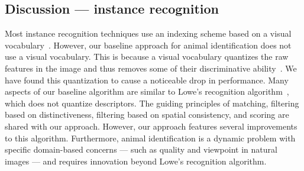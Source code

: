     \subsection{Discussion --- instance recognition}

        Most instance recognition techniques use an indexing scheme
          based on a visual vocabulary~\cite{tolias_image_2015,
          jegou_hamming_2008, philbin_object_2007, cao_learning_2012,
          arandjelovic_all_2013, jegou_negative_2012, chum_fast_2012,
          gong_multiscale_2014}.
        However, our baseline approach for animal identification does
          not use a visual vocabulary.
        This is because a visual vocabulary quantizes the raw features
          in the image and thus removes some of their discriminative
          ability~\cite{philbin_lost_2008, boiman_defense_2008}.
        We have found this quantization to cause a noticeable drop in
          performance.
        Many aspects of our baseline algorithm are similar to Lowe's
          recognition algorithm~\cite{lowe_distinctive_2004}, which does
          not quantize descriptors.
        The guiding principles of matching, filtering based on
          distinctiveness, filtering based on spatial consistency, and
          scoring are shared with our approach.
        However, our approach features several improvements to this
          algorithm.
        Furthermore, animal identification is a dynamic problem with
          specific domain-based concerns --- such as quality and
          viewpoint in natural images --- and requires innovation beyond
          Lowe's recognition algorithm.


